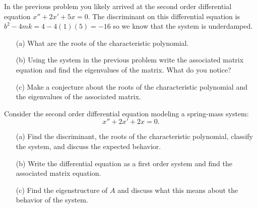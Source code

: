 \begin{problem}
    In the previous problem you likely arrived at the second order differential equation
    $x'' + 2x' + 5x = 0$.  The discriminant on this differential equation is
    $b^2-4mk=4-4(1)(5)=-16$ so we know that the system is underdamped.  
    \begin{enumerate}
        \item[(a)] What are the roots of the characteristic polynomial.
        \item[(b)] Using the system in the previous problem write the associated matrix
            equation and find the eigenvalues of the matrix.  What do you notice?
        \item[(c)] Make a conjecture about the roots of the characteristic polynomial and
            the eigenvalues of the associated matrix.
    \end{enumerate}
\end{problem}

\begin{problem}
    Consider the second order differential equation modeling a spring-mass system: 
    \[ x'' + 2x' + 2x = 0. \]
    \begin{enumerate}
        \item[(a)] Find the discriminant, the roots of the characteristic polynomial,
            classify the system, and discuss the expected behavior.
        \item[(b)] Write the differential equation as a first order system and find the
            associated matrix equation.
            \solution{
            \[ \begin{pmatrix} x' \\ y' \end{pmatrix} = \begin{pmatrix} 0 & 1 \\ -2 & -2
                \end{pmatrix} \begin{pmatrix} x \\ y \end{pmatrix}. \]
            }
        \item[(c)] Find the eigenstructure of $A$ and discuss what this means about the
            behavior of the system.
    \end{enumerate}
\end{problem}

